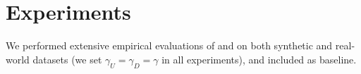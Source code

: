 



\section{Experiments}\label{sec:exp}
We performed extensive empirical evaluations of \modelone{} and \modeltwo{} on both synthetic and real-world datasets (we set $\gamma_{U}=\gamma_{D}=\gamma$ in all experiments), and included \modelbaseline{} \citep{wang2019distributed} as baseline. 
